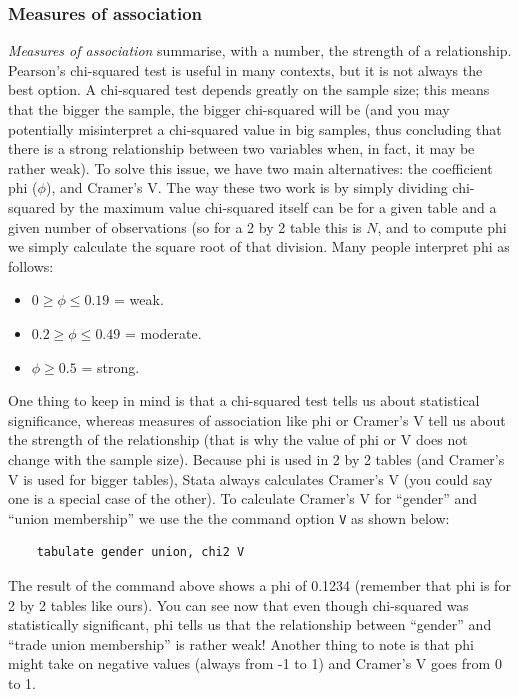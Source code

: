 \subsubsection*{Measures of association}

\textit{Measures of association} summarise, with a number, the strength of a relationship. Pearson’s chi-squared test is useful in many contexts, but it is not always the best option. A chi-squared test depends greatly on the sample size; this means that the bigger the sample, the bigger chi-squared will be (and you may potentially misinterpret a chi-squared value in big samples, thus concluding that there is a strong relationship between two variables when, in fact, it may be rather weak). To solve this issue, we have two main alternatives: the coefficient phi ($\phi$), and Cramer's V. The way these two work is by simply dividing chi-squared by the maximum value chi-squared itself can be for a given table and a given number of observations (so for a 2 by 2 table this is $N$, and to compute phi we simply calculate the square root of that division. Many people interpret phi as follows:

\begin{itemize}
	\item $0 \geq \phi \leq 0.19$ = weak.
	\item $0.2 \geq \phi \leq 0.49$ = moderate.
	\item $\phi \geq 0.5$ = strong.
\end{itemize}

One thing to keep in mind is that a chi-squared test tells us about statistical significance, whereas measures of association like phi or Cramer's V tell us about the strength of the relationship (that is why the value of phi or V does not change with the sample size). Because phi is used in 2 by 2 tables (and Cramer's V is used for bigger tables), Stata always calculates Cramer's V (you could say one is a special case of the other). To calculate Cramer's V for ``gender'' and ``union membership'' we use the the command option \texttt{V} as shown below:

\begin{lstlisting}
	tabulate gender union, chi2 V
\end{lstlisting}

The result of the command above shows a phi of 0.1234 (remember that phi is for 2 by 2 tables like ours). You can see now that even though chi-squared was statistically significant, phi tells us that the relationship between ``gender'' and ``trade union membership'' is rather weak! Another thing to note is that phi might take on negative values (always from -1 to 1) and Cramer's V goes from 0 to 1.
